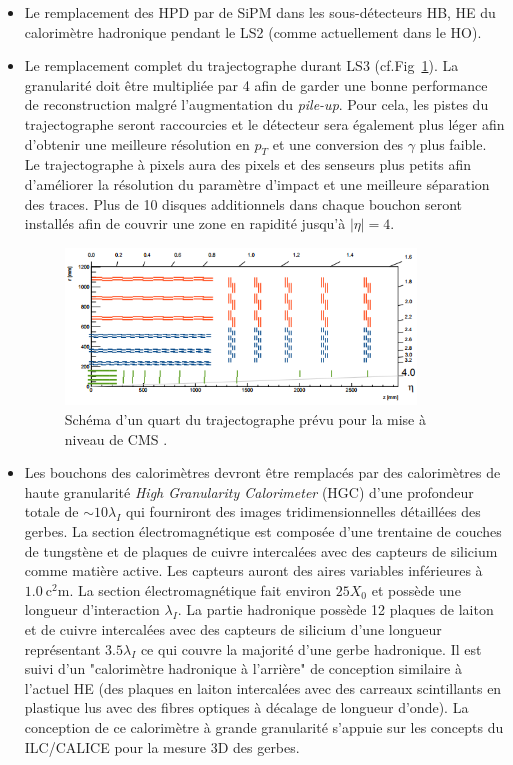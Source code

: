\begin{itemize}[label=$\bullet$]
	\item Le remplacement des HPD par de SiPM dans les sous-détecteurs HB, HE du calorimètre hadronique pendant le LS2 (comme actuellement dans le HO).
	\item Le remplacement complet du trajectographe durant LS3 (cf.Fig~\ref{tracker2}). La granularité doit être multipliée par \num{4} afin de garder une bonne performance de reconstruction malgré l'augmentation du \textit{pile-up}. Pour cela, les pistes du trajectographe seront raccourcies et le détecteur sera également plus léger afin d'obtenir une meilleure résolution en $p_{T}$ et une conversion des $\gamma$ plus faible. Le trajectographe à pixels aura des pixels et des senseurs plus petits afin d'améliorer la résolution du paramètre d'impact et une meilleure séparation des traces. Plus de \num{10} disques additionnels dans chaque bouchon seront installés afin de couvrir une zone en rapidité jusqu'à $|\eta|=\num{4}$.
	\begin{figure}[ht!]
		\centering
		\includegraphics[width=0.88\textwidth]{CMS/tracker2.png}
		\captionsetup{type=figure}\caption{Schéma d'un quart du trajectographe prévu pour la mise à niveau de CMS \cite{MERSI20161034}.}
		\label{tracker2}
	\end{figure}
	\item Les bouchons des calorimètres devront être remplacés par des calorimètres de haute granularité \textit{High Granularity Calorimeter} (HGC) d'une profondeur totale de $\sim\num{10}\lambda_{I}$ qui fourniront des images tridimensionnelles détaillées des gerbes. La section électromagnétique est composée d'une trentaine de couches de tungstène et de plaques de cuivre intercalées avec des capteurs de silicium comme matière active. Les capteurs auront des aires variables inférieures à $\SI{1,0}{\square\centi\meter}$. La section électromagnétique fait environ $\num{25}X_0$ et possède une longueur d'interaction $\lambda_{I}$. La partie hadronique possède \num{12} plaques de laiton et de cuivre intercalées avec des capteurs de silicium d'une longueur représentant $\num{3,5}\lambda_{I}$ ce qui couvre la majorité d'une gerbe hadronique. Il est suivi d'un "calorimètre hadronique à l'arrière" de conception similaire à l'actuel HE (des plaques en laiton intercalées avec des carreaux scintillants en plastique lus avec des fibres optiques à décalage de longueur d'onde). La conception de ce calorimètre à grande granularité s'appuie sur les concepts du ILC/CALICE pour la mesure 3D des gerbes.

\end{itemize}
